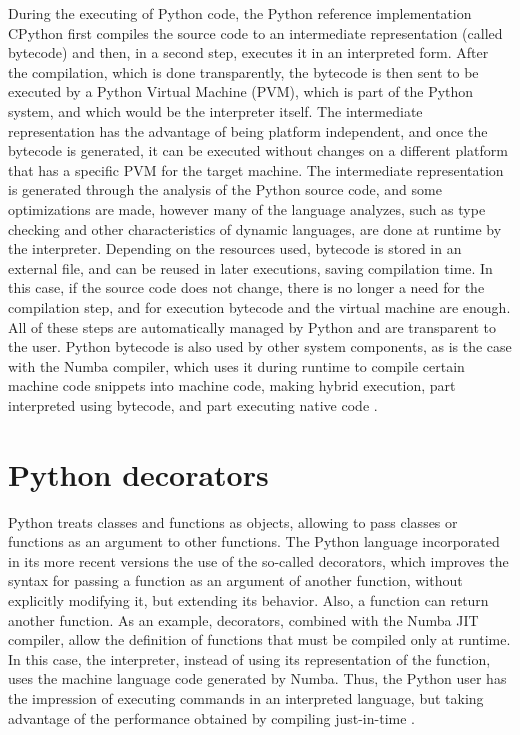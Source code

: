 During the executing of Python code, the Python reference implementation CPython first compiles the source code to an intermediate representation (called bytecode) and then, in a second step, executes it in an interpreted form. After the compilation, which is done transparently, the bytecode is then sent to be executed by a Python Virtual Machine (PVM), which is part of the Python system, and which would be the interpreter itself. The intermediate representation has the advantage of being platform independent, and once the bytecode is generated, it can be executed without changes on a different platform that has a specific PVM for the target machine. The intermediate representation is generated through the analysis of the Python source code, and some optimizations are made, however many of the language analyzes, such as type checking and other characteristics of dynamic languages, are done at runtime by the interpreter.
Depending on the resources used, bytecode is stored in an external file, and can be reused in later executions, saving compilation time. In this case, if the source code does not change, there is no longer a need for the compilation step, and for execution bytecode and the virtual machine are enough. All of these steps are automatically managed by Python and are transparent to the user. Python bytecode is also used by other system components, as is the case with the Numba compiler, which uses it during runtime to compile certain machine code snippets into machine code, making hybrid execution, part interpreted using bytecode, and part executing native code \cite {Lam2015}.

%
%
%
\section{Python decorators}

Python treats classes and functions as objects, allowing to pass classes or functions as an argument to other functions. The Python language incorporated in its more recent versions the use of the so-called decorators, which improves the syntax for passing a function as an argument of another function, without explicitly modifying it, but extending its behavior. Also, a function can return another function. As an example, decorators, combined with the Numba JIT compiler, allow the definition of functions that must be compiled only at runtime. In this case, the interpreter, instead of using its representation of the function, uses the machine language code generated by Numba. Thus, the Python user has the impression of executing commands in an interpreted language, but taking advantage of the performance obtained by compiling just-in-time \cite {Lam2015}.

